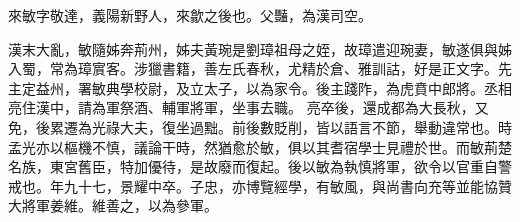 \begin{pinyinscope}
 
 
 來敏字敬達，義陽新野人，來歙之後也。父豔，為漢司空。
 
 
 漢末大亂，敏隨姊奔荊州，姊夫黃琬是劉璋祖母之姪，故璋遣迎琬妻，敏遂俱與姊入蜀，常為璋賔客。涉獵書籍，善左氏春秋，尤精於倉、雅訓詁，好是正文字。先主定益州，署敏典學校尉，及立太子，以為家令。後主踐阼，為虎賁中郎將。丞相亮住漢中，請為軍祭酒、輔軍將軍，坐事去職。
 亮卒後，還成都為大長秋，又免，後累遷為光祿大夫，復坐過黜。前後數貶削，皆以語言不節，舉動違常也。時孟光亦以樞機不慎，議論干時，然猶愈於敏，俱以其耆宿學士見禮於世。而敏荊楚名族，東宮舊臣，特加優待，是故廢而復起。後以敏為執慎將軍，欲令以官重自警戒也。年九十七，景耀中卒。子忠，亦博覽經學，有敏風，與尚書向充等並能協贊大將軍姜維。維善之，以為參軍。
 
 
\end{pinyinscope}